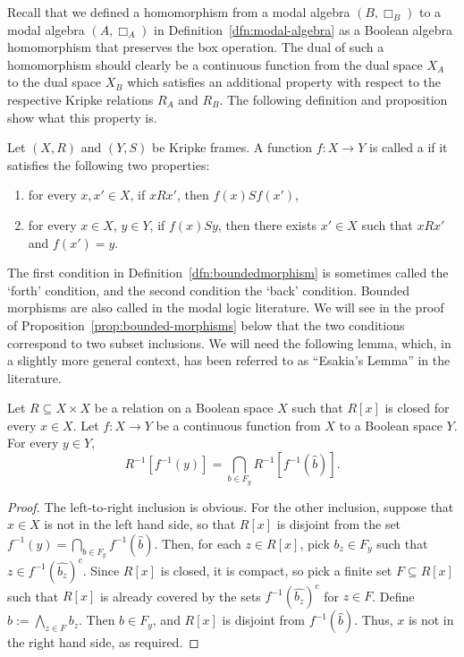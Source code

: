 Recall that we defined a homomorphism from a modal algebra $(B,\Box_B)$ to a modal algebra $(A,\Box_A)$ in Definition~\ref{dfn:modal-algebra} as a Boolean algebra homomorphism that preserves the box operation. The dual of such a homomorphism should clearly be a continuous function from the dual space $X_A$ to the dual space $X_B$ which satisfies an additional property with respect to the respective Kripke relations $R_A$ and $R_B$. The following definition and proposition show what this property is.
\begin{definition}\label{dfn:boundedmorphism}
  Let $(X, R)$ and $(Y, S)$ be Kripke frames. A function $f \colon X \to Y$ is called a  if it satisfies the following two properties:
  \begin{enumerate}
    \item for every $x, x' \in X$, if $x R x'$, then $f(x) S f(x')$,
    \item for every $x \in X$, $y \in Y$, if $f(x) S y$, then there exists $x' \in X$ such that $x R x'$ and $f(x') = y$.
  \end{enumerate}
\end{definition}
The first condition in Definition~\ref{dfn:boundedmorphism} is sometimes called the `forth' condition, and the second condition the `back' condition. Bounded morphisms are also called  in the modal logic literature. We will see in the proof of Proposition~\ref{prop:bounded-morphisms} below that the two conditions correspond to two subset inclusions.
We will need the following lemma, which, in a slightly more general context, has been referred to as ``Esakia's Lemma'' in the literature.
\begin{lemma}\label{lem:esakia-for-boxes}
Let $R \subseteq X \times X$ be a relation on a Boolean space $X$ such that $R[x]$ is closed for every $x \in X$. Let $f \colon X \to Y$ be a continuous function from $X$ to a Boolean space $Y$. For every $y \in Y$,
\[ R^{-1}\left[f^{-1}(y)\right] = \bigcap_{b \in F_y} R^{-1}\left[f^{-1}(\widehat{b})\right].\]
\end{lemma}
\begin{proof}
The left-to-right inclusion is obvious. For the other inclusion, suppose that $x \in X$ is not in the left hand side, so that $R[x]$ is disjoint from the set $f^{-1}(y) = \bigcap_{b \in F_y} f^{-1}(\widehat{b})$. 
Then, for each $z \in R[x]$, pick $b_z \in F_y$ such that $z \in f^{-1}(\widehat{b_z})^c$. Since $R[x]$ is closed, it is compact, so pick a finite set $F \subseteq R[x]$ such that $R[x]$ is already covered by the sets $f^{-1}(\widehat{b_z})^c$ for $z \in F$. Define $b := \bigwedge_{z \in F} b_z$. Then $b \in F_y$, and $R[x]$ is disjoint from $f^{-1}(\widehat{b})$. Thus, $x$ is not in the right hand side, as required.
\end{proof}
